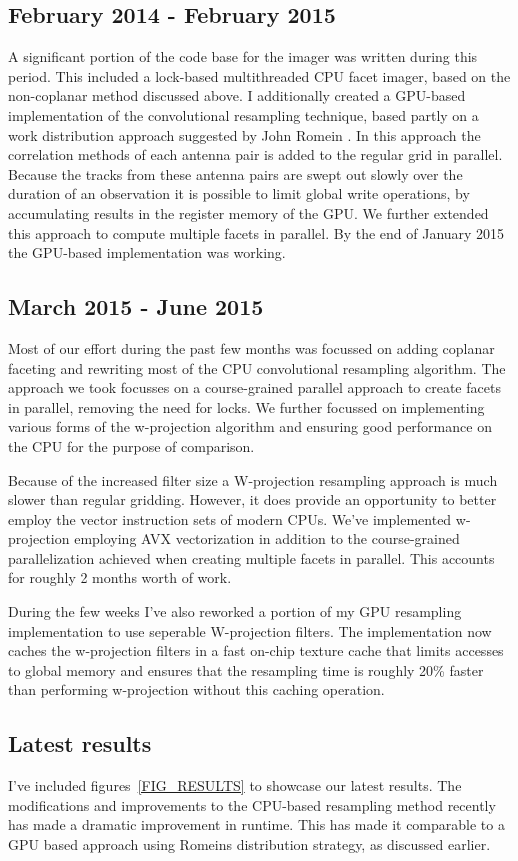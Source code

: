 \documentclass[a4paper,10pt]{article}
\begin{document}
\subsection{February 2014 - February 2015}
A significant portion of the code base for the imager was written during this period. This included a lock-based multithreaded 
CPU facet imager, based on the non-coplanar method discussed above. I additionally created a GPU-based implementation of the
convolutional resampling technique, based partly on a work distribution approach suggested by John Romein \cite{romein2012efficient}.
In this approach the correlation methods of each antenna pair is added to the regular grid in parallel. Because the tracks from these
antenna pairs are swept out slowly over the duration of an observation it is possible to limit global write operations, by accumulating
results in the register memory of the GPU. We further extended this approach to compute multiple facets in parallel. By the end of January 2015
the GPU-based implementation was working.
\subsection{March 2015 - June 2015}
Most of our effort during the past few months was focussed on adding coplanar faceting and rewriting most of the CPU convolutional resampling algorithm.
The approach we took focusses on a course-grained parallel approach to create facets in parallel, removing the need for locks. We further focussed on implementing
various forms of the w-projection algorithm and ensuring good performance on the CPU for the purpose of comparison. 

Because of the increased filter size a W-projection resampling approach is much slower than regular gridding. However, it does provide an opportunity
to better employ the vector instruction sets of modern CPUs. We've implemented w-projection employing AVX vectorization in addition to the course-grained 
parallelization achieved when creating multiple facets in parallel. This accounts for roughly 2 months worth of work.

During the few weeks I've also reworked a portion of my GPU resampling implementation to use seperable W-projection filters. The implementation now
caches the w-projection filters in a fast on-chip texture cache that limits accesses to global memory and ensures that the resampling time is roughly 20\% faster than
performing w-projection without this caching operation.
\subsection{Latest results}
I've included figures~\ref{FIG_RESULTS} to showcase our latest results. The modifications and improvements to the CPU-based resampling method
recently has made a dramatic improvement in runtime. This has made it comparable to a GPU based approach using Romeins distribution strategy,
as discussed earlier.
\end{document}
